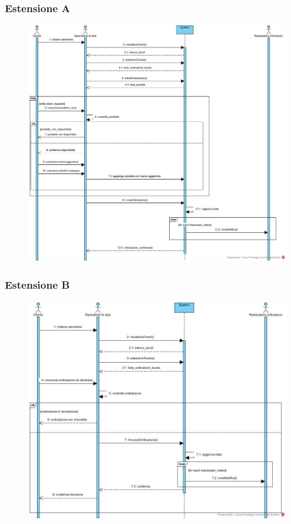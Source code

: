 \subsubsection{Estensione A}
\begin{figure}[H]
	\centering
	\includegraphics[width=1\textwidth]{Immagini/SSD Gestisci Ordinazioni (Successo).jpg}
\end{figure}

\subsubsection{Estensione B}
\begin{figure}[H]
	\centering
	\includegraphics[width=1\textwidth]{Immagini/SSD Gestisci Ordinazione (EstensioneB - Elimina Ordinazione).jpg}
\end{figure}

